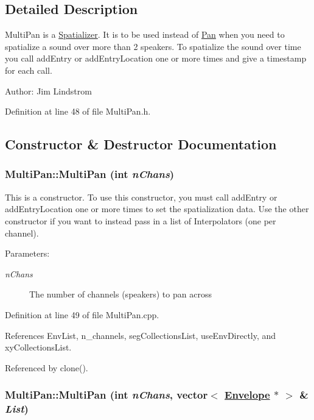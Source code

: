 \subsection{Detailed Description}
Multi\-Pan is a \hyperlink{classSpatializer}{Spatializer}. It is to be used instead of \hyperlink{classPan}{Pan} when you need to spatialize a sound over more than 2 speakers. To spatialize the sound over time you call add\-Entry or add\-Entry\-Location one or more times and give a timestamp for each call. \begin{Desc}
\item[Author:]Jim Lindstrom \end{Desc}




Definition at line 48 of file Multi\-Pan.h.

\subsection{Constructor \& Destructor Documentation}
\hypertarget{classMultiPan_a0}{
\subsubsection[MultiPan]{\setlength{\rightskip}{0pt plus 5cm}Multi\-Pan::Multi\-Pan (int {\em n\-Chans})}}
\label{classMultiPan_a0}


This is a constructor. To use this constructor, you must call add\-Entry or add\-Entry\-Location one or more times to set the spatialization data. Use the other constructor if you want to instead pass in a list of Interpolators (one per channel).

\begin{Desc}
\item[Parameters:]
\begin{description}
\item[{\em n\-Chans}]The number of channels (speakers) to pan across \end{description}
\end{Desc}


Definition at line 49 of file Multi\-Pan.cpp.

References Env\-List, n\_\-channels, seg\-Collections\-List, use\-Env\-Directly, and xy\-Collections\-List.

Referenced by clone().\hypertarget{classMultiPan_a1}{
\subsubsection[MultiPan]{\setlength{\rightskip}{0pt plus 5cm}Multi\-Pan::Multi\-Pan (int {\em n\-Chans}, vector$<$ \hyperlink{classEnvelope}{Envelope} $\ast$ $>$ \& {\em List})}}
\label{classMultiPan_a1}


